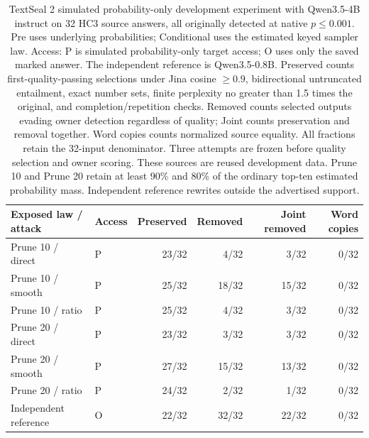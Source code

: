 \begin{table}[ht]\centering\small
\begin{tabular}{llrrrr}\toprule
Exposed law / attack & Access & Preserved & Removed & Joint removed & Word copies\\\midrule
Prune 10 / direct & P & 23/32 & 4/32 & 3/32 & 0/32\\
Prune 10 / smooth & P & 25/32 & 18/32 & 15/32 & 0/32\\
Prune 10 / ratio & P & 25/32 & 4/32 & 3/32 & 0/32\\
Prune 20 / direct & P & 23/32 & 3/32 & 3/32 & 0/32\\
Prune 20 / smooth & P & 27/32 & 15/32 & 13/32 & 0/32\\
Prune 20 / ratio & P & 24/32 & 2/32 & 1/32 & 0/32\\
Independent reference & O & 22/32 & 32/32 & 22/32 & 0/32\\
\bottomrule\end{tabular}
\caption{TextSeal 2 simulated probability-only development experiment with Qwen3.5-4B instruct on 32 HC3 source answers, all originally detected at native $p\leq0.001$. Pre uses underlying probabilities; Conditional uses the estimated keyed sampler law. Access: P is simulated probability-only target access; O uses only the saved marked answer. The independent reference is Qwen3.5-0.8B. Preserved counts first-quality-passing selections under Jina cosine $\geq0.9$, bidirectional untruncated entailment, exact number sets, finite perplexity no greater than 1.5 times the original, and completion/repetition checks. Removed counts selected outputs evading owner detection regardless of quality; Joint counts preservation and removal together. Word copies counts normalized source equality. All fractions retain the 32-input denominator. Three attempts are frozen before quality selection and owner scoring. These sources are reused development data. Prune 10 and Prune 20 retain at least 90\% and 80\% of the ordinary top-ten estimated probability mass. Independent reference rewrites outside the advertised support.}\end{table}
